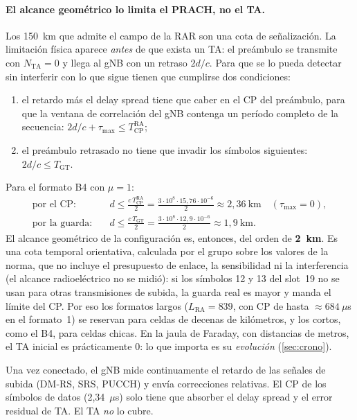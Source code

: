 \paragraph{El alcance geométrico lo limita el PRACH, no el TA.} Los 150~km que admite el campo de la RAR son una cota de señalización. La limitación física aparece \emph{antes} de que exista un TA: el preámbulo se transmite con $N_\text{TA}=0$ y llega al gNB con un retraso $2d/c$. Para que se lo pueda detectar sin interferir con lo que sigue tienen que cumplirse dos condiciones:
\begin{enumerate}
  \item el retardo más el delay spread tiene que caber en el CP del preámbulo, para que la ventana de correlación del gNB contenga un período completo de la secuencia: $2d/c + \tau_\text{max} \le T_\text{CP}^\text{RA}$;
  \item el preámbulo retrasado no tiene que invadir los símbolos siguientes: $2d/c \le T_\text{GT}$.
\end{enumerate}
Para el formato B4 con $\mu=1$:
\begin{align}
\text{por el CP:}\quad & d \le \frac{c\,T_\text{CP}^\text{RA}}{2} = \frac{3\cdot 10^8\cdot 15{,}76\cdot 10^{-6}}{2} \approx 2{,}36~\text{km}\quad(\tau_\text{max}=0),\\
\text{por la guarda:}\quad & d \le \frac{c\,T_\text{GT}}{2} = \frac{3\cdot 10^8\cdot 12{,}9\cdot 10^{-6}}{2} \approx 1{,}9~\text{km}.
\end{align}
El alcance geométrico de la configuración es, entonces, del orden de \textbf{2~km}. Es una cota temporal orientativa, calculada por el grupo sobre los valores de la norma, que no incluye el presupuesto de enlace, la sensibilidad ni la interferencia (el alcance radioeléctrico no se midió): si los símbolos 12 y 13 del slot~19 no se usan para otras transmisiones de subida, la guarda real es mayor y manda el límite del CP. Por eso los formatos largos ($L_\text{RA}=839$, con CP de hasta $\approx 684~\mu$s en el formato~1) se reservan para celdas de decenas de kilómetros, y los cortos, como el B4, para celdas chicas. En la jaula de Faraday, con distancias de metros, el TA inicial es prácticamente 0: lo que importa es su \emph{evolución} (\cref{sec:crono}).

Una vez conectado, el gNB mide continuamente el retardo de las señales de subida (DM-RS, SRS, PUCCH) y envía correcciones relativas. El CP de los símbolos de datos (2,34~$\mu$s) solo tiene que absorber el delay spread y el error residual de TA. El TA \emph{no} lo cubre.

